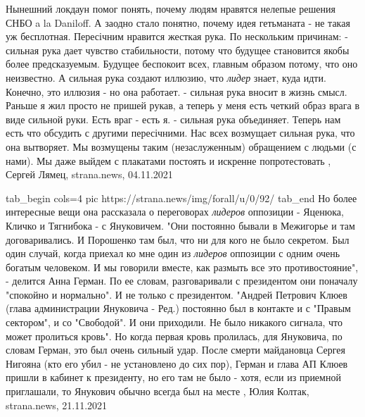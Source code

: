 Нынешний локдаун помог понять, почему людям нравятся нелепые решения СНБО a la
Daniloff. А заодно стало понятно, почему идея гетьманата - не такая уж
бесплотная.  Пересічним нравится жесткая рука. По нескольким причинам:
- сильная рука дает чувство стабильности, потому что будущее становится якобы
более предсказуемым. Будущее беспокоит всех, главным образом потому, что оно
неизвестно. А сильная рука создают иллюзию, что \emph{лидер} знает, куда идти.
Конечно, это иллюзия - но она работает.  - сильная рука вносит в жизнь смысл.
Раньше я жил просто не пришей рукав, а теперь у меня есть четкий образ врага в
виде сильной руки. Есть враг - есть я.  - сильная рука объединяет. Теперь нам
есть что обсудить с другими пересічними. Нас всех возмущает сильная рука, что
она вытворяет. Мы возмущены таким (незаслуженным) обращением с людьми (с нами).
Мы даже выйдем с плакатами постоять и искренне попротестовать
, 
Сергей Лямец, strana.news, 04.11.2021

\ifcmt
  tab_begin cols=4
     pic https://strana.news/img/forall/u/0/92/%
  tab_end
\fi
Но более интересные вещи она рассказала о переговорах \emph{лидеров} оппозиции
- Яценюка, Кличко и Тягнибока - с Януковичем.  "Они постоянно бывали в
Межигорье и там договаривались. И Порошенко там был, что ни для кого не было
секретом. Был один случай, когда приехал ко мне один из \emph{лидеров}
оппозиции с одним очень богатым человеком. И мы говорили вместе, как размыть
все это противостояние", - делится Анна Герман.  По ее словам, разговаривали с
президентом они поначалу "спокойно и нормально".  И не только с президентом.
"Андрей Петрович Клюев (глава администрации Януковича - Ред.) постоянно был в
контакте и с "Правым сектором", и со "Свободой". И они приходили. Не было
никакого сигнала, что может пролиться кровь".  Но когда первая кровь пролилась,
для Януковича, по словам Герман, это был очень сильный удар. После смерти
майдановца Сергея Нигояна (кто его убил - не установлено до сих пор), Герман и
глава АП Клюев пришли в кабинет к президенту, но его там не было - хотя, если
из приемной приглашали, то Янукович обычно всегда был на месте
, 
Юлия Колтак, strana.news, 21.11.2021
